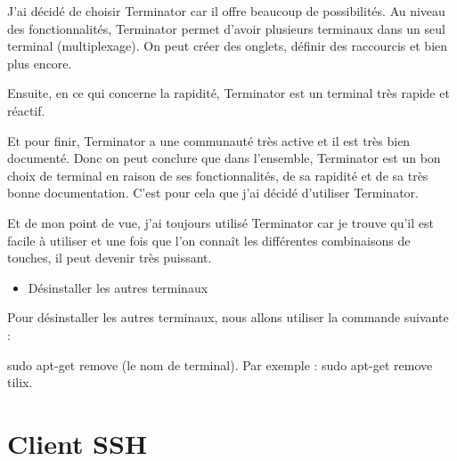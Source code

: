 \documentclass[12pt]{article}
\begin{document}
\vspace{0.3cm}

J'ai décidé de choisir Terminator car il offre beaucoup de possibilités. Au niveau des fonctionnalités, Terminator permet d'avoir plusieurs terminaux dans un seul terminal (multiplexage). On peut créer des onglets, définir des raccourcis et bien plus encore.

\vspace{0.3cm}

Ensuite, en ce qui concerne la rapidité, Terminator est un terminal très rapide et réactif.

\vspace{0.3cm}

Et pour finir, Terminator a une communauté très active et il est très bien documenté. Donc on peut conclure que dans l'ensemble, Terminator est un bon choix de terminal en raison de ses fonctionnalités, de sa rapidité et de sa très bonne documentation. C'est pour cela que j'ai décidé d'utiliser Terminator.

\vspace{0.3cm}

Et de mon point de vue, j'ai toujours utilisé Terminator car je trouve qu'il est facile à utiliser et une fois que l'on connaît les différentes combinaisons de touches, il peut devenir très puissant.

\vspace{0.3cm}

\begin{itemize}
  \item Désinstaller les autres terminaux
\end{itemize}

\vspace{0.3cm}

Pour désinstaller les autres terminaux, nous allons utiliser la commande suivante : 

\vspace{0.3cm}

sudo apt-get remove (le nom de terminal). Par exemple : sudo apt-get remove tilix.



\newpage

\section{Client SSH}
\end{document}
